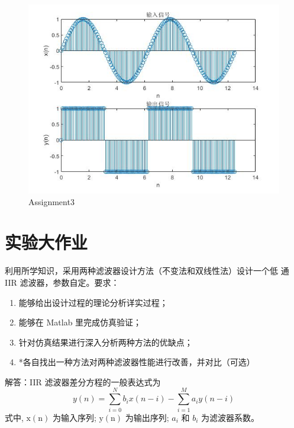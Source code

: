 \documentclass{seuer}
\begin{document}
\begin{figure}[H] %
	\centering %
	\includegraphics[width=1\textwidth]{"../DSPAssignment/Assignment3.jpg"} %
	\caption{Assignment3} %
	\label{Fig4} %
\end{figure}
\section{实验大作业}
利用所学知识，采用两种滤波器设计方法（不变法和双线性法）设计一个低
通 IIR 滤波器，参数自定。要求：
\begin{enumerate}
	\item 能够给出设计过程的理论分析详实过程；
	\item 能够在 Matlab 里完成仿真验证；
	\item 针对仿真结果进行深入分析两种方法的优缺点；
	\item *各自找出一种方法对两种滤波器性能进行改善，并对比（可选）
\end{enumerate}
解答：IIR 滤波器差分方程的一般表达式为
$$
y(n)=\sum_{i=0}^N b_i x(n-i)-\sum_{i=1}^M a_i y(n-i)
$$
式中, $\mathrm{x}(\mathrm{n})$ 为输入序列; $\mathrm{y}(\mathrm{n})$ 为输出序列; $a_i$ 和 $b_i$ 为滤波器系数。
\end{document}
